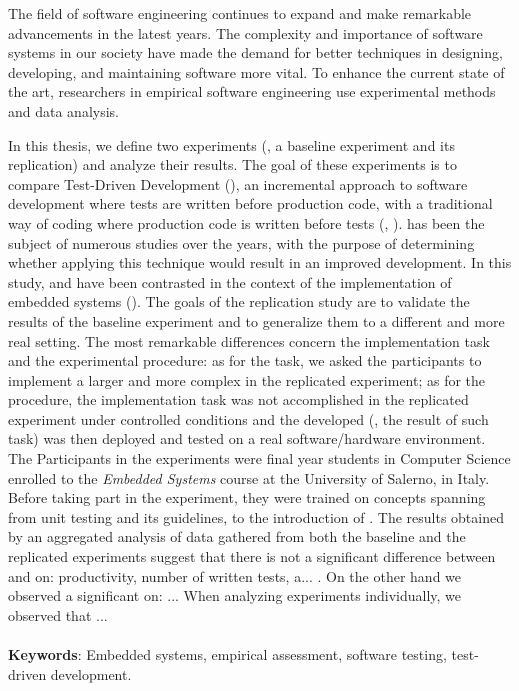 The field of software engineering continues to expand and make remarkable advancements in the latest years. The complexity and importance of software systems in our society have made the demand for better techniques in designing, developing, and maintaining software more vital. To enhance the current state of the art, researchers in empirical software engineering use experimental methods and data analysis.

In this thesis, we define two experiments (\ie, a baseline experiment and its replication) and analyze their results. The goal of these experiments is to compare Test-Driven Development (\tdd), an incremental approach to software development where tests are written before production code, with a traditional way of coding where production code is written before tests (\ie, \notdd). \tdd has been the subject of numerous studies over the years, with the purpose of determining whether applying this technique would result in an improved development. In this study, \tdd and \notdd have been contrasted in the context of the implementation of embedded systems (\ess). The goals of the replication study are to validate the results of the baseline experiment and to generalize them to a different and more real setting. The most remarkable differences concern the implementation task and the experimental procedure: as for the task, we asked the participants to implement a larger and more complex \es in the replicated experiment; as for the procedure, the implementation task was not accomplished in the replicated experiment under controlled conditions and the developed \es (\ie, the result of such task) was then deployed and tested on a real software/hardware environment.  
The Participants in the experiments were final year students in Computer Science enrolled to the \textit{Embedded Systems} course at the University of Salerno, in Italy. Before taking part in the experiment, they were trained on concepts spanning from unit testing and its guidelines, to the introduction of \tdd.
The results obtained by an aggregated analysis of data gathered from both the baseline and the replicated experiments suggest that there is not a significant difference between \tdd and \notdd on: productivity, number of written tests, a... . On the other hand we observed a significant on: ... When analyzing experiments individually, we observed that ... 
\\ \ \\
\noindent \textbf{Keywords}: Embedded systems, empirical assessment, software testing, test-driven development.